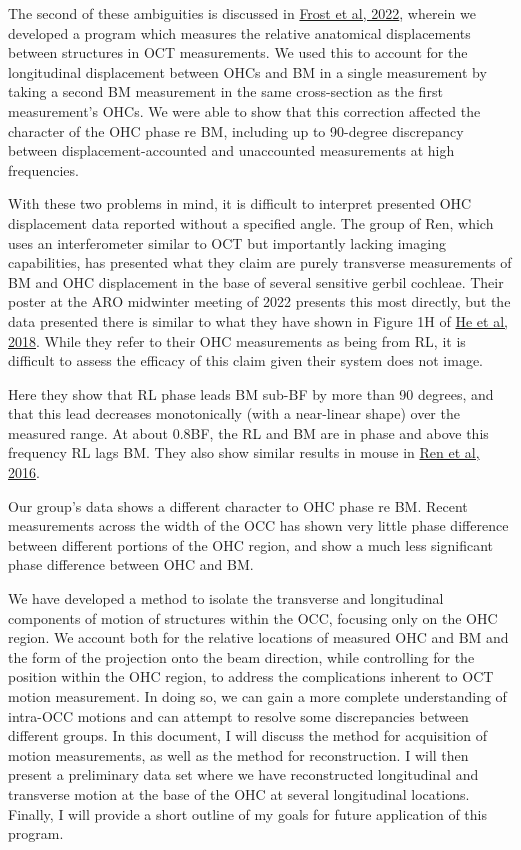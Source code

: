 \documentclass{article}
\begin{document}
\par{The second of these ambiguities is discussed in \href{https://asa.scitation.org/doi/full/10.1121/10.0009576}{Frost et al, 2022}, wherein we developed a program which measures the relative anatomical displacements between structures in OCT measurements. We used this to account for the longitudinal displacement between OHCs and BM in a single measurement by taking a second BM measurement in the same cross-section as the first measurement's OHCs. We were able to show that this correction affected the character of the OHC phase re BM, including up to 90-degree discrepancy between displacement-accounted and unaccounted measurements at high frequencies.}
\par{With these two problems in mind, it is difficult to interpret presented OHC displacement data reported without a specified angle. The group of Ren, which uses an interferometer similar to OCT but importantly lacking imaging capabilities, has presented what they claim are purely transverse measurements of BM and OHC displacement in the base of several sensitive gerbil cochleae. Their poster at the ARO midwinter meeting of 2022 presents this most directly, but the data presented there is similar to what they have shown in Figure 1H of \href{https://elifesciences.org/articles/37625}{He et al, 2018}. While they refer to their OHC measurements as being from RL, it is difficult to assess the efficacy of this claim given their system does not image.}
\par{Here they show that RL phase leads BM sub-BF by more than 90 degrees, and that this lead decreases monotonically (with a near-linear shape) over the measured range. At about 0.8BF, the RL and BM are in phase and above this frequency RL lags BM. They also show similar results in mouse in \href{https://www.pnas.org/doi/10.1073/pnas.1607428113}{Ren et al, 2016}.}
\par{Our group's data shows a different character to OHC phase re BM. Recent measurements across the width of the OCC has shown very little phase difference between different portions of the OHC region, and show a much less significant phase difference between OHC and BM.}
\par{We have developed a method to isolate the transverse and longitudinal components of motion of structures within the OCC, focusing only on the OHC region. We account both for the relative locations of measured OHC and BM and the form of the projection onto the beam direction, while controlling for the position within the OHC region, to address the complications inherent to OCT motion measurement. In doing so, we can gain a more complete understanding of intra-OCC motions and can attempt to resolve some discrepancies between different groups. In this document, I will discuss the method for acquisition of motion measurements, as well as the method for reconstruction. I will then present a preliminary data set where we have reconstructed longitudinal and transverse motion at the base of the OHC at several longitudinal locations. Finally, I will provide a short outline of my goals for future application of this program.}
\end{document}
